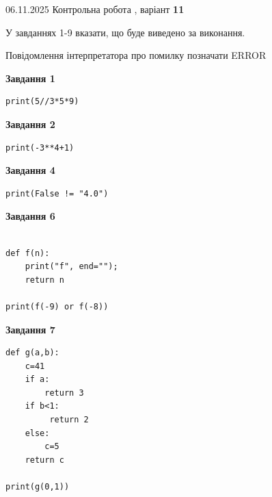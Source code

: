 \documentclass[12pt, ukrainian]{article}
\begin{document}
{\Large{06.11.2025 Контрольна робота , варіант  \No \textbf { 11 }\par}}
{
\begin {large}
У завданнях 1-9 вказати, що буде виведено за виконання.

Повідомлення інтерпретатора про помилку позначати ERROR

\begin{minipage}[t]{7.5cm}

\begin{center}
\textbf{Завдання 1}
\end{center}

\begin{verbatim}
print(5//3*5*9)
\end{verbatim}



\begin{center}
\textbf{Завдання 2}
\end{center}

\begin{verbatim}
print(-3**4+1)
\end{verbatim}



\begin{center}
\textbf{Завдання 4}
\end{center}

\begin{verbatim}
print(False != "4.0")
\end{verbatim}



\begin{center}
\textbf{Завдання 6}
\end{center}

\begin{verbatim}

def f(n):
    print("f", end="");
    return n

print(f(-9) or f(-8))
\end{verbatim}



\begin{center}
\textbf{Завдання 7}
\end{center}

\begin{verbatim}
def g(a,b):
    c=41
    if a:
        return 3
    if b<1:
         return 2
    else: 
        c=5
    return c

print(g(0,1))
\end{verbatim}


\end{minipage}
\end{large}}
\end{document}
